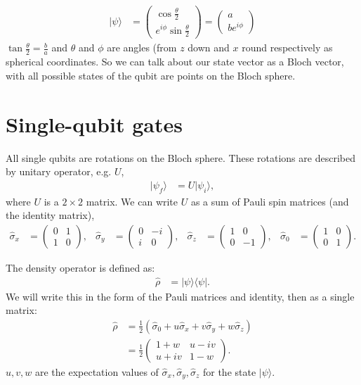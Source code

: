 \documentclass[lasers.tex]{subfiles}
\begin{document}
\begin{align}
    |\psi\rangle &= \begin{pmatrix}\cos\frac{\theta}{2} \\ e^{i\phi}\sin\frac{\theta}{2}\end{pmatrix} = \begin{pmatrix} a \\ be^{i\phi}\end{pmatrix} 
\end{align}
$\tan\frac{\theta}{2} = \frac{b}{a}$ and $\theta$ and $\phi$ are angles (from $z$ down and $x$ round respectively as spherical coordinates. 
So we can talk about our state vector as a Bloch vector, with all possible states of the qubit are points on the Bloch sphere.

\section{Single-qubit gates}
All single qubits are rotations on the Bloch sphere. 
These rotations are described by unitary operator, e.g. $U$,
\begin{align}
    |\psi_f\rangle &= U|\psi_i\rangle,
\end{align}
where $U$ is a $2\times2$ matrix. 
We can write $U$ as a sum of Pauli spin matrices (and the identity matrix),
\begin{align}
    \hat{\sigma}_x &= \begin{pmatrix}0&1\\1&0\end{pmatrix}, & \hat{\sigma}_y &= \begin{pmatrix}0&-i\\i&0\end{pmatrix}, & \hat{\sigma}_z &= \begin{pmatrix}1&0\\0&-1\end{pmatrix}, & \hat{\sigma}_0 &= \begin{pmatrix}1&0\\0&1\end{pmatrix}.
\end{align}

\begin{example}
    The density operator is defined as:
    \begin{align}
        \hat{\rho} &= |\psi\rangle\langle\psi|.
    \end{align}
    We will write this in the form of the Pauli matrices and identity, then as a single matrix:
    \begin{align}
        \hat{\rho} &= \frac12\left(\hat{\sigma}_0 + u\hat{\sigma}_x + v\hat{\sigma}_y + w\hat{\sigma}_z\right) \\
                   &= \frac12\begin{pmatrix} 1+w & u-iv \\ u+iv & 1-w\end{pmatrix}.
    \end{align}
    $u,v,w$ are the expectation values of $\hat{\sigma}_x,\hat{\sigma}_y,\hat{\sigma}_z$ for the state $|\psi\rangle$.
\end{example}
\end{document}
